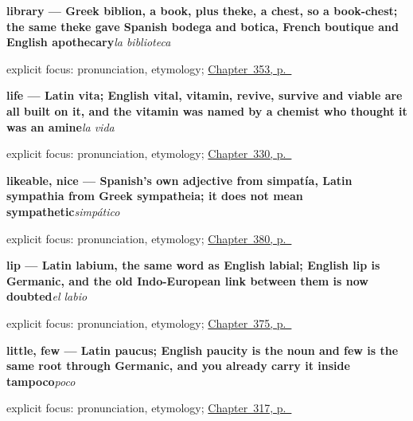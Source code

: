 \noindent\begin{minipage}[t]{\linewidth}
\raggedright
\textbf{library — Greek biblion, a book, plus theke, a chest, so a book-chest; the same theke gave Spanish bodega and botica, French boutique and English apothecary}\enspace\emph{la biblioteca}\par
\footnotesize explicit focus: pronunciation, etymology; \hyperref[ch:el-hospital-y-el-banco]{Chapter~353, p.~\pageref*{ch:el-hospital-y-el-banco}}
\end{minipage}\par\smallskip

\noindent\begin{minipage}[t]{\linewidth}
\raggedright
\textbf{life — Latin vita; English vital, vitamin, revive, survive and viable are all built on it, and the vitamin was named by a chemist who thought it was an amine}\enspace\emph{la vida}\par
\footnotesize explicit focus: pronunciation, etymology; \hyperref[ch:camino-y-vez]{Chapter~330, p.~\pageref*{ch:camino-y-vez}}
\end{minipage}\par\smallskip

\noindent\begin{minipage}[t]{\linewidth}
\raggedright
\textbf{likeable, nice — Spanish's own adjective from simpatía, Latin sympathia from Greek sympatheia; it does not mean sympathetic}\enspace\emph{simpático}\par
\footnotesize explicit focus: pronunciation, etymology; \hyperref[ch:simpatico-y-alegre]{Chapter~380, p.~\pageref*{ch:simpatico-y-alegre}}
\end{minipage}\par\smallskip

\noindent\begin{minipage}[t]{\linewidth}
\raggedright
\textbf{lip — Latin labium, the same word as English labial; English lip is Germanic, and the old Indo-European link between them is now doubted}\enspace\emph{el labio}\par
\footnotesize explicit focus: pronunciation, etymology; \hyperref[ch:la-una-y-el-labio]{Chapter~375, p.~\pageref*{ch:la-una-y-el-labio}}
\end{minipage}\par\smallskip

\noindent\begin{minipage}[t]{\linewidth}
\raggedright
\textbf{little, few — Latin paucus; English paucity is the noun and few is the same root through Germanic, and you already carry it inside tampoco}\enspace\emph{poco}\par
\footnotesize explicit focus: pronunciation, etymology; \hyperref[ch:algo-y-nadie]{Chapter~317, p.~\pageref*{ch:algo-y-nadie}}
\end{minipage}\par\smallskip


